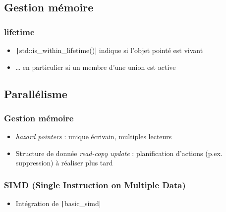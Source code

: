 \documentclass[C++.tex]{subfiles}
\begin{document}
\subsection*{Gestion mémoire}
\begin{frame}[fragile]
	\frametitle{lifetime}
	\begin{itemize}
		\item \texttt|std::is_within_lifetime()| indique si l'objet pointé est vivant
		\item \ldots{} en particulier si un membre d'une union est active
	\end{itemize}

\end{frame}

\subsection*{Parallélisme}
\begin{frame}[fragile]
	\frametitle{Gestion mémoire}
	\begin{itemize}
		\item \textit{hazard pointers} : unique écrivain, multiples lecteurs
		\item Structure de donnée \textit{read-copy update} : planification d'actions (p.ex. suppression) à réaliser plus tard
	\end{itemize}

\end{frame}

\begin{frame}[fragile]
	\frametitle{SIMD (Single Instruction on Multiple Data)}
	\begin{itemize}
		\item Intégration de \texttt|basic_simd|
	\end{itemize}

\end{frame}
\end{document}
